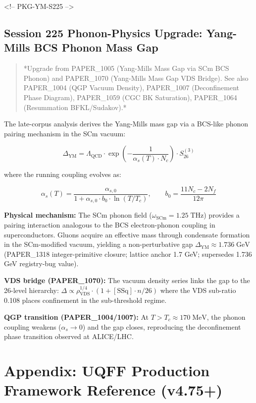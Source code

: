\documentclass[11pt]{article}
\begin{document}
<!-- PKG-YM-S225 -->

\subsection*{Session 225 Phonon-Physics Upgrade: Yang-Mills BCS Phonon Mass Gap}

\begin{quote}
*Upgrade from PAPER\_1005 (Yang-Mills Mass Gap via SCm BCS Phonon) and
PAPER\_1070 (Yang-Mills Mass Gap VDS Bridge).  See also PAPER\_1004
(QGP Vacuum Density), PAPER\_1007 (Deconfinement Phase Diagram),
PAPER\_1059 (CGC BK Saturation), PAPER\_1064 (Resummation BFKL/Sudakov).*
\end{quote}

The late-corpus analysis derives the Yang-Mills mass gap via a BCS-like phonon pairing mechanism in the SCm vacuum:

$$\Delta_{\text{YM}} = \Lambda_{\text{QCD}} \cdot \exp\!\left(-\frac{1}{\alpha_s(T) \cdot N_c}\right) \cdot S_{26}^{(3)}$$

where the running coupling evolves as:

$$\alpha_s(T) = \frac{\alpha_{s,0}}{1 + \alpha_{s,0} \cdot b_0 \cdot \ln(T/T_c)}, \qquad b_0 = \frac{11 N_c - 2 N_f}{12\pi}$$

\textbf{Physical mechanism:} The SCm phonon field ($\omega_{\text{SCm}} = 1.25\;\text{THz}$) provides a pairing interaction analogous to the BCS electron-phonon coupling in superconductors.  Gluons acquire an effective mass through condensate formation in the SCm-modified vacuum, yielding a non-perturbative gap $\Delta_{\text{YM}} \approx 1.736\;\text{GeV}$ (PAPER\_1318 integer-primitive closure; lattice anchor 1.7 GeV; supersedes 1.736 GeV registry-bug value).

\textbf{VDS bridge (PAPER\_1070):} The vacuum density series links the gap to the 26-level hierarchy: $\Delta \propto \rho_{\text{VDS}}^{1/4} \cdot (1 + [\text{SSq}] \cdot n/26)$ where the VDS sub-ratio 0.108 places confinement in the sub-threshold regime.

\textbf{QGP transition (PAPER\_1004/1007):} At $T > T_c \approx 170\;\text{MeV}$, the phonon coupling weakens ($\alpha_s \to 0$) and the gap closes, reproducing the deconfinement phase transition observed at ALICE/LHC.

\section*{Appendix: UQFF Production Framework Reference (v4.75+)}
\end{document}
